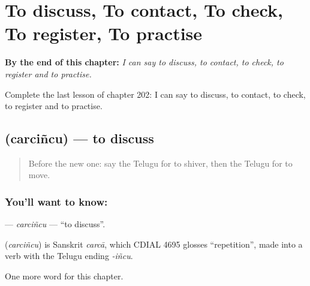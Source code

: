 
\chapter{To discuss, To contact, To check, To register, To practise}
\label{ch:te-to-discuss-to-contact-to-check-to-register-to-practise}

\begin{chapteropening}
\textbf{By the end of this chapter:} \emph{I can say to discuss, to contact, to check, to register and to practise.}

Complete the last lesson of chapter 202: I can say to discuss, to contact, to check, to register and to practise.
\end{chapteropening}

\section[\texorpdfstring{\te{చర్చించు} (carciñcu)}{చర్చించు (carciñcu)}]{ (carciñcu) — to discuss}

\label{lesson:TE-C202-carcincu}



\begin{quote}
Before the new one: say the Telugu for to shiver, then the Telugu for to move.
\end{quote}

\subsection*{You'll want to know: }
\textbf{} — \emph{carciñcu} — \textquotedblleft{}to discuss\textquotedblright{}.

\begin{cousinweb}
\textbf{} (\emph{carciñcu}) is Sanskrit \emph{carcā}, which CDIAL 4695 glosses \textquotedblleft{}repetition\textquotedblright{}, made into a verb with the Telugu ending \emph{-iñcu}.
\end{cousinweb}

\begin{grammarlens}[title={What you've built}]
One more word for this chapter.
\end{grammarlens}

